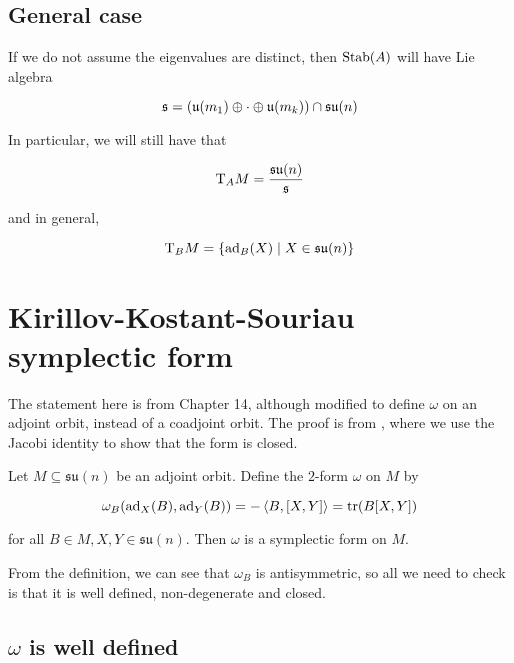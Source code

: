 \documentclass{report}
\newcommand{\su}{\mathfrak{su}}
\begin{document}
\subsection{General case}

If we do not assume the eigenvalues are distinct, then \(\operatorname{Stab}(A)\) will have Lie algebra

\[\mfs = \left(\mfu(m_1) \oplus \cdot \oplus \mfu(m_k)\right) \cap \su(n)\]

In particular, we will still have that

\[\TT_A M = \frac{\su(n)}{\mfs}\]

and in general,

\[\TT_B M = \left\{\ad_B(X) \mid X \in \su(n)\right\}\]

\section{Kirillov-Kostant-Souriau symplectic form}

\label{sec:kks}

The statement here is from \cite{marsden_ratiu} Chapter 14, although modified to define \(\omega\) on an adjoint orbit, instead of a coadjoint orbit. The proof is from \cite[Section II.1.d]{audin}, where we use the Jacobi identity to show that the form is closed.

\begin{theorem}
    
    Let \(M \subseteq \su(n)\) be an adjoint orbit. Define the \(2\)-form \(\omega\) on \( M\) by

    \begin{equation}
        \label{eq:kks}
        \omega_B(\operatorname{ad}_X(B), \operatorname{ad}_Y(B)) = -\left\langle B, [X, Y] \right\rangle = \tr(B[X,Y])
    \end{equation}

    for all \(B \in M, X, Y \in \su(n)\). Then \(\omega\) is a symplectic form on \(M\).

    \label{thm:kks}
\end{theorem}

From the definition, we can see that \(\omega_B\) is antisymmetric, so all we need to check is that it is well defined, non-degenerate and closed.

\subsection{\(\omega\) is well defined}
\end{document}
